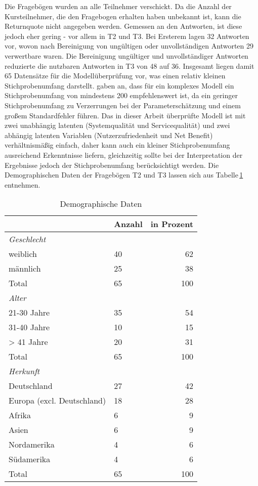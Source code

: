 Die Fragebögen wurden an alle Teilnehmer verschickt. Da die Anzahl der Kursteilnehmer, die den Fragebogen erhalten haben unbekannt ist, kann die Returnquote nicht angegeben werden. Gemessen an den Antworten, ist diese jedoch eher gering - vor allem in T2 und T3. Bei Ersterem lagen 32 Antworten vor, wovon nach Bereinigung von ungültigen oder unvollständigen Antworten 29 verwertbare waren. Die Bereinigung ungültiger und unvollständiger Antworten reduzierte die nutzbaren Antworten in T3 von 48 auf 36. Insgesamt liegen damit 65 Datensätze für die Modellüberprüfung vor, was einen relativ kleinen Stichprobenumfang darstellt. \cite[S. 5]{jakobowicz2006understanding} gaben an, dass für ein komplexes Modell ein Stichprobenumfang von mindestens 200 empfehlenswert ist, da ein geringer Stichprobenumfang zu Verzerrungen bei der Parameterschätzung und einem großem Standardfehler führen. Das in dieser Arbeit überprüfte Modell ist mit zwei unabhängig latenten (Systemqualität und Servicequalität) und zwei abhängig latenten Variablen (Nutzerzufriedenheit und Net Benefit) verhältnismäßig einfach, daher kann auch ein kleiner Stichprobenumfang ausreichend Erkenntnisse liefern, gleichzeitig sollte bei der Interpretation der Ergebnisse jedoch der Stichprobenumfang berücksichtigt werden. 
Die Demographischen Daten der Fragebögen T2 und T3 lassen sich aus Tabelle\,\ref{tab:Demographische Daten} entnehmen. 
 

\begin{table}[ht] 
\footnotesize
\caption{Demographische Daten}
\label{tab:Demographische Daten} 
\begin{tabular}{@{}lp{5cm}r@{}} \toprule

 & \textbf{Anzahl}&\textbf{in Prozent} \\ \midrule

\textit{Geschlecht}		& 				& \\ 
weiblich 				&  40 			& 62 \\
männlich				&  25			& 38 \\ 
Total					&  65			& 100 \\
\textit{Alter}			& 				&   \\
21-30 Jahre				&  35			& 54 \\
31-40 Jahre				&  10			& 15	  \\
> 41 Jahre				&  20 			& 31 \\
Total 					&  65			& 100 \\
\textit{Herkunft}		&				&   \\
Deutschland				& 27 			& 42  \\
Europa (excl. Deutschland) &18			& 28  \\
Afrika 					& 6				& 9   \\
Asien 					& 6				& 9   \\
Nordamerika				& 4				& 6   \\
Südamerika				& 4				& 6	 \\
Total					& 65				& 100  \\ 
  \bottomrule

\end{tabular}	
\end{table}


